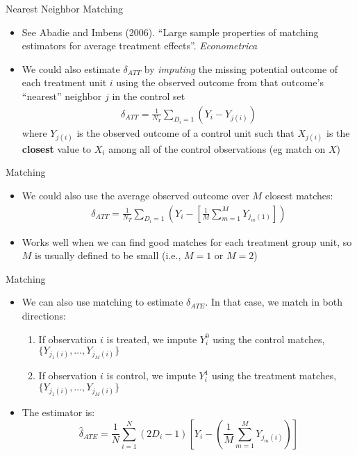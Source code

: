\documentclass{beamer}
\begin{document}
\begin{frame}{Nearest Neighbor Matching}
	
	\begin{itemize}
	\item See Abadie and Imbens (2006). ``Large sample properties of matching
        estimators for average treatment effects''.  \emph{Econometrica}
	\item We could also estimate $\delta_{ATT}$ by \emph{imputing} the missing potential outcome of each treatment unit $i$ using the observed outcome from that outcome's ``nearest'' neighbor $j$ in the control set
		\begin{eqnarray*}
		\delta_{ATT} = \frac{1}{N_T}\sum_{D_i=1} (Y_i - Y_{j(i)})
		\end{eqnarray*}where $Y_{j(i)}$ is the observed outcome of a control unit such that $X_{j(i)}$ is the \textbf{closest} value to $X_i$ among all of the control observations (eg match on $X$)
	\end{itemize}
\end{frame}

\begin{frame}{Matching}
	
	\begin{itemize}
	\item We could also use the average observed outcome over $M$ closest matches:
		\begin{eqnarray*}
		\delta_{ATT} = \frac{1}{N_T}\sum_{D_i=1}\left(Y_i-\left[\frac{1}{M}\sum_{m=1}^MY_{j_m(1)}\right]\right)
		\end{eqnarray*}
	\item Works well when we can find good matches for each treatment group unit, so $M$ is usually defined to be small (i.e., $M=1$ or $M=2$)
	\end{itemize}
\end{frame}

\begin{frame}{Matching}
	
	\begin{itemize}
	\item We can also use matching to estimate $\delta_{ATE}$.  In that case, we match in both directions:
		\begin{enumerate}
		\item If observation $i$ is treated, we impute $Y^0_i$ using the control matches,     $\{Y_{j_1(i)}, \dots, Y_{j_M(i)}\}$
		\item If observation $i$ is control, we impute $Y^1_i$ using the treatment matches, $\{Y_{j_1(i)}, \dots, Y_{j_M(i)}\}$
		\end{enumerate}
	\item The estimator is:$$\widehat{\delta}_{ATE} = \frac{1}{N} \sum_{i=1}^N (2D_i -1) \left[ Y_i - \left( \frac{1}{M} \sum_{m=1}^M Y_{j_m(i)} \right) \right]$$	
	\end{itemize}
	
\end{frame}
\end{document}
